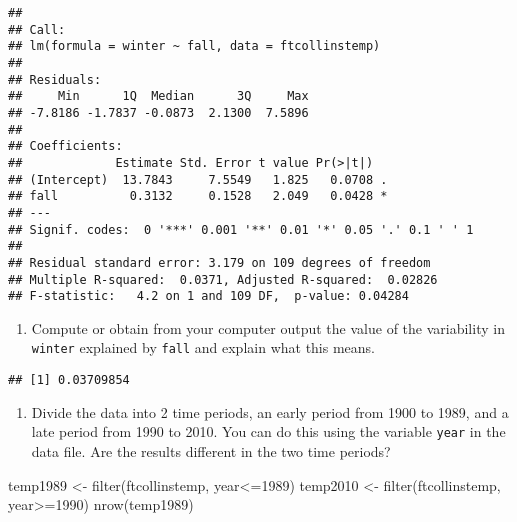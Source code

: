 \documentclass[
]{article}
\newenvironment{Shaded}{\begin{snugshade}}{\end{snugshade}}
\newcommand{\DecValTok}[1]{\textcolor[rgb]{0.00,0.00,0.81}{#1}}
\newcommand{\FunctionTok}[1]{\textcolor[rgb]{0.00,0.00,0.00}{#1}}
\newcommand{\NormalTok}[1]{#1}
\newcommand{\OtherTok}[1]{\textcolor[rgb]{0.56,0.35,0.01}{#1}}
\newcommand{\SpecialCharTok}[1]{\textcolor[rgb]{0.00,0.00,0.00}{#1}}
\providecommand{\tightlist}{%
  \setlength{\itemsep}{0pt}\setlength{\parskip}{0pt}}
\begin{document}
\begin{verbatim}
## 
## Call:
## lm(formula = winter ~ fall, data = ftcollinstemp)
## 
## Residuals:
##     Min      1Q  Median      3Q     Max 
## -7.8186 -1.7837 -0.0873  2.1300  7.5896 
## 
## Coefficients:
##             Estimate Std. Error t value Pr(>|t|)  
## (Intercept)  13.7843     7.5549   1.825   0.0708 .
## fall          0.3132     0.1528   2.049   0.0428 *
## ---
## Signif. codes:  0 '***' 0.001 '**' 0.01 '*' 0.05 '.' 0.1 ' ' 1
## 
## Residual standard error: 3.179 on 109 degrees of freedom
## Multiple R-squared:  0.0371, Adjusted R-squared:  0.02826 
## F-statistic:   4.2 on 1 and 109 DF,  p-value: 0.04284
\end{verbatim}

\begin{enumerate}
\def\labelenumi{\alph{enumi}.}
\setcounter{enumi}{2}
\tightlist
\item
  Compute or obtain from your computer output the value of the
  variability in \texttt{winter} explained by \texttt{fall} and explain
  what this means.
\end{enumerate}

\begin{Shaded}
\end{Shaded}

\begin{verbatim}
## [1] 0.03709854
\end{verbatim}

\begin{enumerate}
\def\labelenumi{\alph{enumi}.}
\setcounter{enumi}{3}
\tightlist
\item
  Divide the data into 2 time periods, an early period from 1900 to
  1989, and a late period from 1990 to 2010. You can do this using the
  variable \texttt{year} in the data file. Are the results different in
  the two time periods?
\end{enumerate}

\begin{Shaded}
\begin{Highlighting}[]
\NormalTok{temp1989 }\OtherTok{\textless{}{-}} \FunctionTok{filter}\NormalTok{(ftcollinstemp, year}\SpecialCharTok{\textless{}=}\DecValTok{1989}\NormalTok{)}
\NormalTok{temp2010 }\OtherTok{\textless{}{-}} \FunctionTok{filter}\NormalTok{(ftcollinstemp, year}\SpecialCharTok{\textgreater{}=}\DecValTok{1990}\NormalTok{)}
\FunctionTok{nrow}\NormalTok{(temp1989)}
\end{Highlighting}
\end{Shaded}
\end{document}
